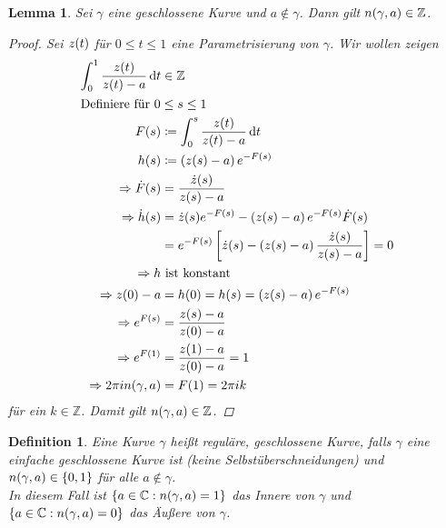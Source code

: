 \documentclass[11pt, a4paper]{article}
\theoremstyle{plain}
\newtheorem{definition}[blockelement]{Definition}
\newtheorem{lemma}[blockelement]{Lemma}
\numberwithin{equation}{subsection}
\newcommand{\set}[1]{\left\{#1\right\}}
\newcommand{\pair}[1]{\left(#1\right)}
\newcommand{\of}[1]{\mathopen{}\mathclose{}\bgroup\left(#1\aftergroup\egroup\right)}
\newcommand{\interv}[1]{\left[#1\right]}
\newcommand{\impl}[0]{\Rightarrow{}}
\newcommand{\dif}{\mathop{}\!\mathrm{d}}
\newcommand{\C}{\mathbb{C}}
\newcommand{\Z}{\mathbb{Z}}
\begin{document}
    \begin{lemma}
        Sei $\gamma$ eine geschlossene Kurve und $a\not\in\gamma$. Dann gilt $n\of{\gamma, a} \in\Z$.

        \begin{proof}
            Sei $z\of{t}$ für $0\leq t \leq 1$ eine Parametrisierung von $\gamma$. Wir wollen zeigen
            \begin{align*}
                \int_{0}^{1} \frac{z\of{t}}{z\of{t}-a} \dif t &\in\Z\\
                \intertext{Definiere für $0\leq s \leq 1$}
                F\of{s} &\coloneqq \int_{0}^{s} \frac{z\of{t}}{z\of{t}-a} \dif t\\
                h\of{s} &\coloneqq \pair{z\of{s} - a}e^{-F\of{s}}\\
                \impl \dot F\of{s} &= \frac{\dot z\of{s}}{z\of{s} - a}\\
                \impl \dot h\of{s} &= \dot z\of{s}e^{-F\of{s}} - \pair{z\of{s} - a}e^{-F\of{s}}\dot F\of{s}\\
                &= e^{-F\of{s}}\interv{\dot z\of{s} - \pair{z\of{s} - a}\frac{\dot z\of{s}}{z\of{s} - a}} = 0\\
                \impl h&\text{ ist konstant}\\
                \impl z\of{0} - a &= h\of{0} = h\of{s} = \pair{z\of{s} - a}e^{-F\of{s}}\\
                \impl e^{F\of{s}} &= \frac{z\of{s} - a}{z\of{0} - a}\\
                \impl e^{F\of{1}} &= \frac{z\of{1} - a}{z\of{0} - a} = 1\\
                \impl 2\pi i n\of{\gamma, a} &= F\of{1} = 2\pi i k
            \end{align*}
            für ein $k\in\Z$. Damit gilt $n\of{\gamma, a} \in \Z$.
        \end{proof}
    \end{lemma}

    \begin{definition}
        Eine Kurve $\gamma$ heißt reguläre, geschlossene Kurve, falls $\gamma$ eine einfache geschlossene Kurve ist (keine Selbstüberschneidungen) und $n\of{\gamma, a} \in\set{0, 1}$ für alle $a\not\in\gamma$.\\
        In diesem Fall ist $\set{a\in \C: n\of{\gamma, a} = 1}$ das Innere von $\gamma$ und $\set{a\in\C: n\of{\gamma, a} = 0}$ das Äußere von $\gamma$.
    \end{definition}
\end{document}
